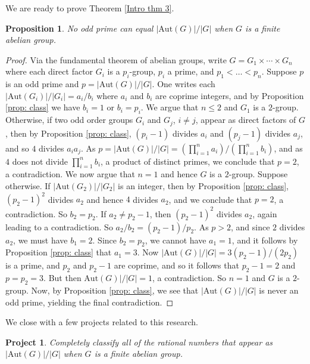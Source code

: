 \documentclass[12pt]{amsart}
\newtheorem{proj}{Project}
\newtheorem{proposition}[theorem]{Proposition}
\begin{document}
We are ready to prove Theorem \ref{Intro thm 3}.

\begin{proposition}
No odd prime can equal $|\mathrm{Aut}(G)|/|G|$ when $G$ is a finite abelian group.
\end{proposition}

\begin{proof}
Via the fundamental theorem of abelian groups, write $G = G_1 \times \cdots \times G_n$ where each direct factor $G_i$ is a $p_i$-group, $p_i$ a prime, and $p_1 < \dots < p_n$.  Suppose $p$ is an odd prime and $p = |\mathrm{Aut}(G)|/|G|$.  One writes each $|\mathrm{Aut}(G_i)|/|G_i| = a_i/b_i$ where $a_i$ and $b_i$ are coprime integers, and by Proposition \ref{prop: class} we have $b_i=1$ or $b_i = p_i$. We argue that $n \leq 2$ and $G_1$ is a $2$-group.  Otherwise, if two odd order groups $G_i$ and $G_j$, $i \neq j$, appear as direct factors of $G$, then by Proposition \ref{prop: class}, $(p_i-1)$ divides $a_i$ and $(p_j-1)$ divides $a_j$, and so $4$ divides $a_i a_j$. As $p =|\mathrm{Aut}(G)|/|G| = (\prod_{i=1}^n a_i)/(\prod_{i=1}^n b_i)$, and as $4$ does not divide $\prod_{i=1}^n b_i$, a product of distinct primes, we conclude that $p=2$, a contradiction.  We now argue that $n=1$ and hence $G$ is a $2$-group.  Suppose otherwise.  If $|\mathrm{Aut}(G_2)|/|G_2|$ is an integer, then by Proposition \ref{prop: class}, $(p_2-1)^2$ divides $a_2$ and hence $4$ divides $a_2$, and we conclude that $p=2$, a contradiction.  So $b_2 = p_2$.  If $a_2 \neq p_2-1$, then $(p_2-1)^2$ divides $a_2$, again leading to a contradiction.  So $a_2/b_2 = (p_2-1)/p_2$.  As $p > 2$, and since $2$ divides $a_2$, we must have $b_1 = 2$.  Since $b_2 = p_2$, we cannot have $a_1 = 1$, and it follows by Proposition \ref{prop: class} that $a_1 = 3$.  Now $|\mathrm{Aut}(G)|/|G| = 3(p_2-1)/(2p_2)$ is a prime, and $p_2$ and $p_2-1$ are coprime, and so it follows that $p_2 - 1 = 2$ and $p=p_2=3$.  But then $\mathrm{Aut}(G)|/|G| = 1$, a contradiction.  So $n=1$ and $G$ is a $2$-group.  Now, by Proposition \ref{prop: class}, we see that $|\mathrm{Aut}(G)|/|G|$ is never an odd prime, yielding the final contradiction.
\end{proof}

We close with a few projects related to this research.

\begin{proj}
Completely classify all of the rational numbers that appear as $|\mathrm{Aut}(G)|/|G|$ when $G$ is a finite abelian group.
\end{proj}
\end{document}

